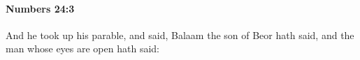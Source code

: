 
		\paragraph{Numbers 24:3} %
			\label{NUMBERS-24-3}

			And he took up his parable, and said, Balaam the son of Beor hath said, and the man whose eyes are open hath said:


